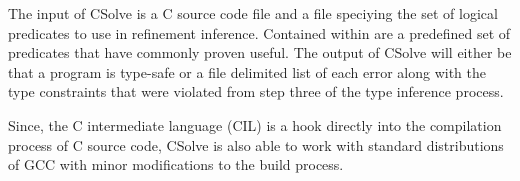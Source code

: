 The input of CSolve is a C source code file and a file speciying the set of logical predicates to use in refinement inference. Contained within are a predefined set of predicates that have commonly proven useful. The output of CSolve will either be that a program is type-safe or a file delimited list of each error along with the type constraints that were violated from step three of the type inference process.

Since, the C intermediate language (CIL) is a hook directly into the compilation process of C source code, CSolve is also able to work with standard distributions of GCC with minor modifications to the build process.


